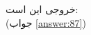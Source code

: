 \section{}
\paragraph{}\label{hint:93}
خروجی این است:
\LTR\noindent
{}\\
\RTL
(جواب \ref{answer:87})